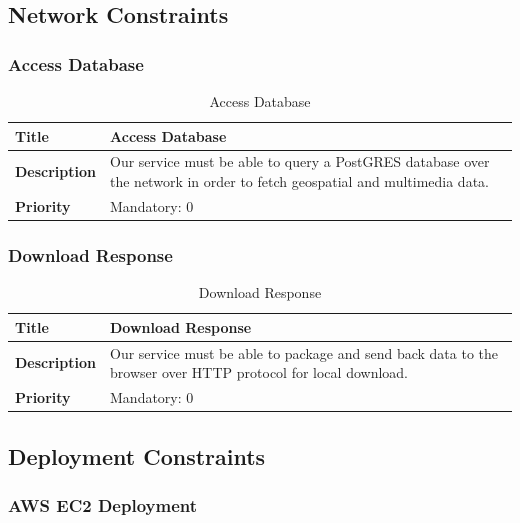 \documentclass{article}
\begin{document}
\subsection{Network Constraints}

\subsubsection{Access Database}

\begin{table}[H]
	\caption{Access Database}
	\begin{tabularx}{\textwidth}{|l|X|}
		\hline
		\textbf{Title}       & Access Database                              \\ \hline
		\textbf{Description} & Our service must be able to query a PostGRES
		database over the network in order to fetch geospatial and multimedia
		data.     \\ \hline
		\textbf{Priority}    & Mandatory: 0                                 \\ \hline
	\end{tabularx}
\end{table}

\subsubsection{Download Response}

\begin{table}[H]
	\caption{Download Response}
	\begin{tabularx}{\textwidth}{|l|X|}
		\hline
		\textbf{Title}       & Download Response                                 \\ \hline
		\textbf{Description} & Our service must be able to package and send back
		data to the browser over HTTP protocol for local download. \\ \hline
		\textbf{Priority}    & Mandatory: 0                                      \\ \hline
	\end{tabularx}
\end{table}

\subsection{Deployment Constraints}

\subsubsection{AWS EC2 Deployment}
\end{document}
